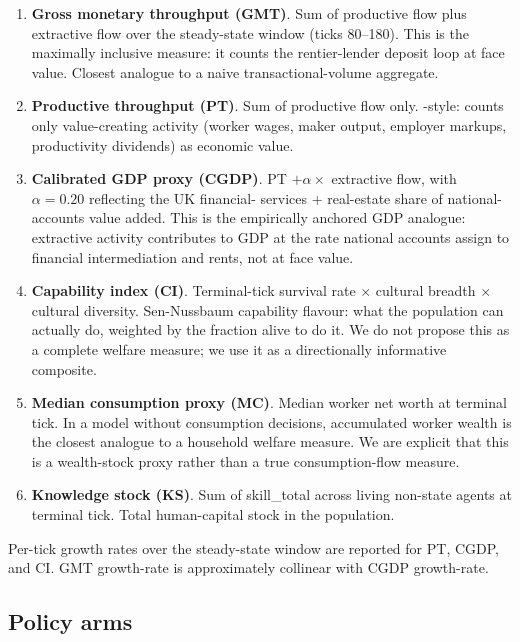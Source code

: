\documentclass[11pt]{article}
\begin{document}
\begin{enumerate}
\item \textbf{Gross monetary throughput (GMT)}.  Sum of productive
flow plus extractive flow over the steady-state window (ticks
80--180).  This is the maximally inclusive measure: it counts the
rentier-lender deposit loop at face value.  Closest analogue to a
naive transactional-volume aggregate.

\item \textbf{Productive throughput (PT)}.  Sum of productive
flow only.  \citet{mazzucato2018value}-style: counts only
value-creating activity (worker wages, maker output, employer
markups, productivity dividends) as economic value.

\item \textbf{Calibrated GDP proxy (CGDP)}.  PT $+ \alpha \times$
extractive flow, with $\alpha = 0.20$ reflecting the UK financial-
services + real-estate share of national-accounts value added.
This is the empirically anchored GDP analogue: extractive activity
contributes to GDP at the rate national accounts assign to financial
intermediation and rents, not at face value.

\item \textbf{Capability index (CI)}.  Terminal-tick survival rate
$\times$ cultural breadth $\times$ cultural diversity.  Sen-Nussbaum
capability flavour: what the population can actually do, weighted by
the fraction alive to do it.  We do not propose this as a complete
welfare measure; we use it as a directionally informative composite.

\item \textbf{Median consumption proxy (MC)}.  Median worker net
worth at terminal tick.  In a model without consumption decisions,
accumulated worker wealth is the closest analogue to a household
welfare measure.  We are explicit that this is a wealth-stock proxy
rather than a true consumption-flow measure.

\item \textbf{Knowledge stock (KS)}.  Sum of skill\_total across
living non-state agents at terminal tick.  Total human-capital stock
in the population.
\end{enumerate}

Per-tick growth rates over the steady-state window are reported for
PT, CGDP, and CI.  GMT growth-rate is approximately collinear with
CGDP growth-rate.

\subsection{Policy arms}
\end{document}
